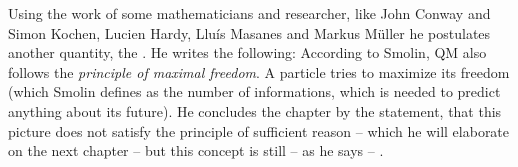 Using the work of some mathematicians and researcher, like John Conway and Simon Kochen, Lucien Hardy, Lluís Masanes and Markus Müller he postulates another quantity, the . He writes the following:  According to Smolin, QM also follows the \textit{principle of maximal freedom}. A particle tries to maximize its freedom (which Smolin defines as the number of informations, which is needed to predict anything about its future). He concludes the chapter by the statement, that this picture does not satisfy the principle of sufficient reason -- which he will elaborate on the next chapter -- but this concept is still -- as he says -- .

